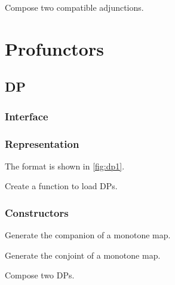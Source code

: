 \begin{exercise}
Compose two compatible adjunctions.
\end{exercise}


\chapter{Profunctors}


\section{DP}

\label{sec:exercises-DP}

\subsection*{Interface}

\subsection*{Representation}


The format is shown in \cref{fig:dp1}.


\begin{exercise}
Create a function to load DPs.
%
\end{exercise}

\subsection*{Constructors}


\begin{exercise}
Generate the companion of a monotone map.
%
\end{exercise}

\begin{exercise}
Generate the conjoint of a monotone map.
%
%
\end{exercise}





\begin{exercise}
Compose two DPs.
%
\end{exercise}

